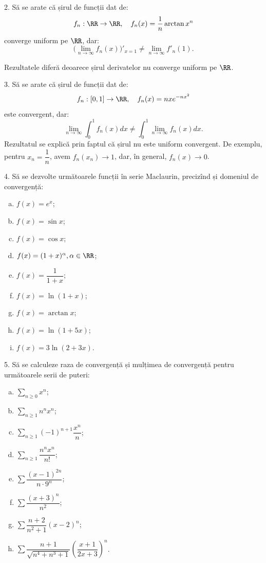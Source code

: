 \vspace{1cm}

2. Să se arate că șirul de funcții dat de:
\[
  f_n : \RR \to \RR, \quad f_n(x) = \frac{1}{n} \arctan x^n
\]
converge uniform pe $ \RR $, dar:
\[
  \Big( \lim_{n \to \infty} f_n(x) \Big)'_{x = 1} \neq \lim_{n \to \infty} f'_n(1).
\]

Rezultatele diferă deoarece șirul derivatelor nu converge uniform pe $ \RR $.

\vspace{1cm}

3. Să se arate că șirul de funcții dat de:
\[
  f_n : [0, 1] \to \RR, \quad f_n(x) = nxe^{-nx^2}
\]
este convergent, dar:
\[
  \lim_{n \to \infty} \int_0^1 f_n(x) dx \neq \int_0^1 \lim_{n \to \infty} f_n(x) dx.
\]
Rezultatul se explică prin faptul că șirul nu este uniform convergent.
De exemplu, pentru $ x_n = \dfrac{1}{n} $, avem $ f_n(x_n) \to 1 $, dar,
în general, $ f_n(x) \to 0 $.

\vspace{1cm}

4. Să se dezvolte următoarele funcții în serie Maclaurin, precizînd și
domeniul de convergență:
\begin{enumerate}[(a)]
\item $ f(x) = e^x $;
\item $ f(x) = \sin x $;
\item $ f(x) = \cos x $;
\item $ f(x) = (1 + x)^\alpha, \alpha \in \RR $;
\item $ f(x) = \dfrac{1}{1 + x} $;
\item $ f(x) = \ln(1 + x) $;
\item $ f(x) = \arctan x $;
\item $ f(x) = \ln(1 + 5x)$;
\item $ f(x) = 3 \ln(2 + 3x) $.
\end{enumerate}


\vspace{1cm}

5. Să se calculeze raza de convergență și mulțimea de convergență pentru
următoarele serii de puteri:
\begin{enumerate}[(a)]
\item $ \sum_{n \geq 0} x^n $;
\item $ \sum_{n \geq 1} n^n x^n $;
\item $ \sum_{n \geq 1} (-1)^{n+1} \dfrac{x^n}{n} $;
\item $ \sum_{n \geq 1} \dfrac{n^nx^n}{n!} $;
\item $ \sum \dfrac{(x - 1)^{2n}}{n \cdot 9^n} $;
\item $ \sum \dfrac{(x + 3)^n}{n^2} $;
\item $ \sum \dfrac{n + 2}{n^2 + 1} (x - 2)^n $;
\item $ \sum \dfrac{n + 1}{\sqrt{n^4 + n^3 + 1}} \left( \dfrac{x + 1}{2x + 3} \right)^n $.
\end{enumerate}

